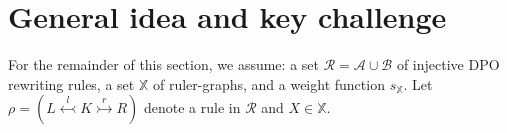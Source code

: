 



\section{General idea and key challenge}
\label{sec:general_idea}
For the remainder of this section, we assume: a set \( \mathcal{R} = \mathcal{A} \cup \mathcal{B} \) of injective DPO rewriting rules, a set \( \mathbb{X} \) of ruler-graphs, and a weight function \( s_{\mathbb{X}} \).  Let \( \rho = (L \overset{l}{\leftarrowtail} K \overset{r}{\rightarrowtail} R) \) denote a rule in \( \mathcal{R} \) and \( X \in \mathbb{X} \).

